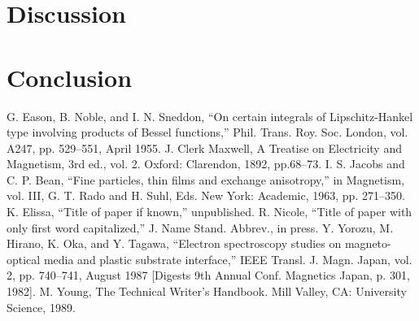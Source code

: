\documentclass[conference]{IEEEtran}
\begin{document}
\section{Discussion}



\section{Conclusion}


\begin{thebibliography}{00}
 G. Eason, B. Noble, and I. N. Sneddon, ``On certain integrals of Lipschitz-Hankel type involving products of Bessel functions,'' Phil. Trans. Roy. Soc. London, vol. A247, pp. 529--551, April 1955.
 J. Clerk Maxwell, A Treatise on Electricity and Magnetism, 3rd ed., vol. 2. Oxford: Clarendon, 1892, pp.68--73.
 I. S. Jacobs and C. P. Bean, ``Fine particles, thin films and exchange anisotropy,'' in Magnetism, vol. III, G. T. Rado and H. Suhl, Eds. New York: Academic, 1963, pp. 271--350.
 K. Elissa, ``Title of paper if known,'' unpublished.
 R. Nicole, ``Title of paper with only first word capitalized,'' J. Name Stand. Abbrev., in press.
 Y. Yorozu, M. Hirano, K. Oka, and Y. Tagawa, ``Electron spectroscopy studies on magneto-optical media and plastic substrate interface,'' IEEE Transl. J. Magn. Japan, vol. 2, pp. 740--741, August 1987 [Digests 9th Annual Conf. Magnetics Japan, p. 301, 1982].
 M. Young, The Technical Writer's Handbook. Mill Valley, CA: University Science, 1989.
\end{thebibliography}
\vspace{12pt}
\end{document}
